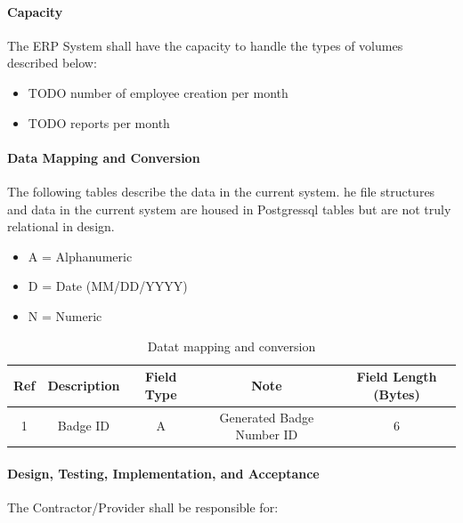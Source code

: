 \paragraph{Capacity}
The ERP System shall have the capacity to handle the types of volumes described below:
\begin{itemize}
	\item {TODO} number of employee creation per month
	\item {TODO} reports per month
\end{itemize}

\paragraph{Data Mapping and Conversion}
The following tables describe the data in the current system. he file structures and data in the current system are housed in Postgressql tables but are not truly relational in design.

\begin{itemize}
	\item A = Alphanumeric
	\item D = Date (MM/DD/YYYY)
	\item N = Numeric
\end{itemize}

\begin{center}
\begin{table}[!hb]
\begin{tabular}{|c|c|c|c|c| } 
  \hline
  \textbf{Ref} & \textbf{Description} & \textbf{Field Type} & \textbf{Note} & \textbf{Field Length (Bytes)} \\ 
  \hline
  1 & Badge ID & A & Generated Badge Number ID & 6 \\ 
  \hline
\end{tabular}
\caption{Datat mapping and conversion}
\end{table}
\end{center}


\paragraph{Design, Testing, Implementation, and Acceptance}
The Contractor/Provider shall be responsible for:

